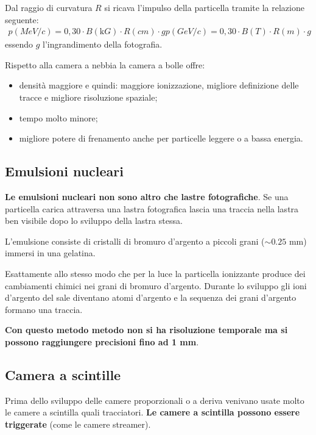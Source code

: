 \documentclass[a4paper,11pt,twoside,openany]{book}
\theoremstyle{definition}
\theoremstyle{plain}
\theoremstyle{plain}
\theoremstyle{definition}
\begin{document}
Dal raggio di curvatura $R$ si ricava l’impulso della particella tramite la relazione seguente:
\begin{equation}\begin{split}
p(\si{MeV/c}) = 0,30\cdot B(\si{\kilo G})\cdot R(\si{cm})\cdot g
p(\si{GeV/c})=0,30\cdot B(\si{T})\cdot R(\si{m})\cdot g
\end{split}\end{equation}
essendo $g$ l'ingrandimento della fotografia.

Rispetto alla camera a nebbia la camera a bolle offre:
\begin{itemize}
\item densità maggiore e quindi: maggiore ionizzazione, migliore definizione delle tracce e migliore risoluzione spaziale;
\item tempo molto minore;
\item migliore potere di frenamento anche per particelle leggere o a bassa energia.
\end{itemize}

\subsection{Emulsioni nucleari} %
\textbf{Le emulsioni nucleari non sono altro che lastre fotografiche}. Se una particella carica attraversa una lastra fotografica lascia una traccia nella lastra ben visibile dopo lo sviluppo della lastra stessa.

L’emulsione consiste di cristalli di bromuro d’argento a piccoli grani ($\sim 0.25$ mm) immersi in una gelatina.

Esattamente allo stesso modo che per la luce la particella ionizzante produce dei cambiamenti chimici nei grani di bromuro d’argento. Durante lo sviluppo gli ioni d’argento del sale diventano atomi d’argento e la sequenza dei grani d’argento formano una traccia.

\textbf{Con questo metodo metodo non si ha risoluzione temporale ma si possono raggiungere precisioni fino ad 1 mm}.

\subsection{Camera a scintille} %
Prima dello sviluppo delle camere proporzionali o a deriva venivano usate molto le camere a scintilla quali tracciatori. \textbf{Le camere a scintilla possono essere triggerate} (come le camere streamer).
\end{document}
